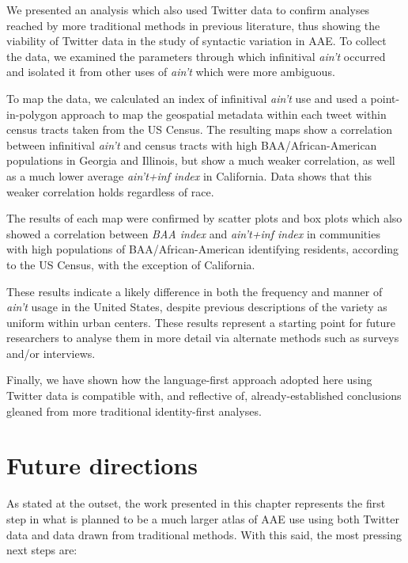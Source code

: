 \documentclass[output=paper,colorlinks,citecolor=brown,draftmode]{langscibook}
\begin{document}
We presented an analysis which also used Twitter data to confirm analyses reached by more traditional methods in previous literature, thus showing the viability of Twitter data in the study of syntactic variation in AAE.  To collect the data, we examined the parameters through which infinitival \textit{ain't} occurred and isolated it from other uses of \textit{ain't} which were more ambiguous.  

To map the data, we calculated an index of infinitival \textit{ain't} use and used a point-in-polygon approach to map the geospatial metadata within each tweet within census tracts taken from the US Census. The resulting maps show a correlation between infinitival \textit{ain't} and census tracts with high BAA/African-American populations in Georgia and Illinois, but show a much weaker correlation, as well as a much lower average \textit{ain't+inf index} in California.  Data shows that this weaker correlation holds regardless of race.

The results of each map were confirmed by scatter plots and box plots which also showed a correlation between \textit{BAA index} and \textit{ain't+inf index} in communities with high populations of BAA/African-American identifying residents, according to the US Census, with the exception of California.

These results indicate a likely difference in both the frequency and manner of \textit{ain't} usage in the United States, despite previous descriptions of the variety as uniform within urban centers. These results represent a starting point for future researchers to analyse them in more detail via alternate methods such as surveys and/or interviews.

Finally, we have shown how the language-first approach adopted here using Twitter data is compatible with, and reflective of, already-established conclusions gleaned from more traditional identity-first analyses.

\section{Future directions}\label{sec.fut}
As stated at the outset, the work presented in this chapter represents the first step in what is planned to be a much larger atlas of AAE use using both Twitter data and data drawn from traditional methods. With this said, the most pressing next steps are:\largerpage[2]
\end{document}
